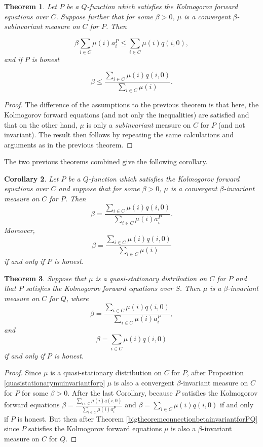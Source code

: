 \documentclass[12pt,a4paper]{scrartcl}
\newtheorem{theorem}{Theorem}[section]
\newtheorem{corollary}[theorem]{Corollary}
\numberwithin{equation}{section}
\begin{document}
\begin{theorem}
Let $P$ be a $Q$-function which satisfies the Kolmogorov forward equations over $C$. Suppose further that for some $\beta > 0$, $\mu$ is a convergent $\beta$-subinvariant measure on $C$ for $P$. Then

$$ \beta \sum_{i \in C} \mu\left(i\right) a_i^P \leq \sum_{i \in C} \mu\left(i\right) q\left(i,0\right), $$
and if $P$ is honest

$$ \beta  \leq \frac{\sum_{i \in C} \mu\left(i\right) q\left(i,0\right)}{\sum_{i \in C} \mu\left(i\right)}.$$


\end{theorem}
\begin{proof}
The difference of the assumptions to the previous theorem is that here, the Kolmogorov forward equations (and not only the inequalities) are satisfied and that on the other hand, $\mu$ is only a \emph{subinvariant} measure on $C$ for $P$ (and not invariant). The result then follows by repeating the same calculations and arguments as in the previous theorem.
\end{proof}

The two previous theorems combined give the following corollary.

\begin{corollary}
Let $P$ be a $Q$-function which satisfies the Kolmogorov forward equations over $C$ and suppose that for some $\beta > 0$,  $\mu$ is a convergent $\beta$-invariant measure on $C$ for $P$. Then
$$ \beta = \frac{\sum_{i \in C}\mu\left(i\right) q\left(i,0\right)}{\sum_{i \in C}\mu\left(i\right) a_i^P}.$$
Moreover,
$$ \beta = \frac{\sum_{i \in C} \mu\left(i\right) q\left(i,0\right)}{\sum_{i \in C} \mu\left(i\right)}$$
if and only if $P$ is honest.
\end{corollary}

\begin{theorem}
Suppose that $\mu$ is a quasi-stationary distribution on $C$ for $P$ and that $P$ satisfies the Kolmogorov forward equations over $S$. Then $\mu$ is a $\beta$-invariant measure on $C$ for $Q$, where
$$ \beta = \frac{\sum_{i \in C}\mu\left(i\right) q\left(i,0\right)}{\sum_{i \in C}\mu\left(i\right) a_i^P},$$
and
$$\beta = \sum_{i \in C}\mu\left(i\right) q\left(i,0\right)$$
if and only if $P$ is honest.
\end{theorem}

\begin{proof}
Since $\mu$ is a quasi-stationary distribution on $C$ for $P$, after Proposition \ref{quasistationarymuinvariantforp} $\mu$ is also a convergent $\beta$-invariant measure on $C$ for $P$ for some $\beta > 0.$ After the last Corollary, because $P$ satisfies the Kolmogorov forward equations $\beta = \frac{\sum_{i \in C}\mu\left(i\right) q\left(i,0\right)}{\sum_{i \in C}\mu\left(i\right) a_i^P}$ and $\beta = \sum_{i \in C}\mu\left(i\right) q\left(i,0\right)$ if and only if $P$ is honest. But then after Theorem \ref{bigtheoremconnectionbetainvariantforPQ} since $P$ satisfies the Kolmogorov forward equations $\mu$ is also a $\beta$-invariant measure on $C$ for $Q$.
\end{proof}
\end{document}
